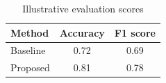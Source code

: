 \begin{table}[htbp]
    \centering
    \caption{Illustrative evaluation scores}
    \label{tab:results}
    \begin{tabular}{lcc}
        \toprule
        Method & Accuracy & F1 score \\
        \midrule
        Baseline & 0.72 & 0.69 \\
        Proposed & 0.81 & 0.78 \\
        \bottomrule
    \end{tabular}
\end{table}
